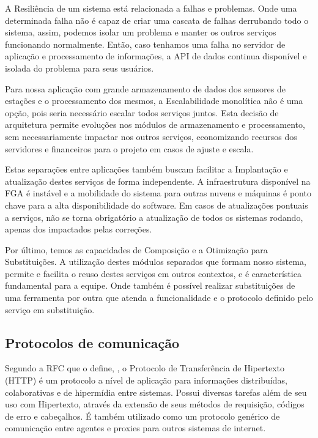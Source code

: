     A Resiliência de um sistema está relacionada a falhas e problemas. Onde uma determinada falha não é capaz de criar uma cascata de falhas derrubando todo o sistema, assim, podemos isolar um problema e manter os outros serviços funcionando normalmente. Então, caso tenhamos uma falha no servidor de aplicação e processamento de informações, a API de dados continua disponível e isolada do problema para seus usuários.
    
    Para nossa aplicação com grande armazenamento de dados dos sensores de estações e o processamento dos mesmos, a Escalabilidade monolítica não é uma opção, pois seria necessário escalar todos serviços juntos. Esta decisão de arquitetura permite evoluções nos módulos de armazenamento e processamento, sem necessariamente impactar nos outros serviços, economizando recursos dos servidores e financeiros para o projeto em casos de ajuste e escala.
    
    Estas separações entre aplicações também buscam facilitar a Implantação e atualização destes serviços de forma independente. A infraestrutura disponível na FGA é instável e a mobilidade do sistema para outras nuvens e máquinas é ponto chave para a alta disponibilidade do software. Em casos de atualizações pontuais a serviços, não se torna obrigatório a atualização de todos os sistemas rodando, apenas dos impactados pelas correções.
    
    Por último, temos as capacidades de Composição e a Otimização para Substituições. A utilização destes módulos separados que formam nosso sistema, permite e facilita o reuso destes serviços em outros contextos, e é característica fundamental para a equipe. Onde também é possível realizar substituições de uma ferramenta por outra que atenda a funcionalidade e o protocolo definido pelo serviço em substituição.

    \subsection{Protocolos de comunicação}
    
    Segundo a RFC que o define, \cite{rfc}, o Protocolo de Transferência de Hipertexto (HTTP) é um protocolo a nível de aplicação para informações distribuídas, colaborativas e de hipermídia entre sistemas. Possui diversas tarefas além de seu uso com Hipertexto, através da extensão de seus métodos de requisição, códigos de erro e cabeçalhos. É também utilizado como um protocolo genérico de comunicação entre agentes e proxies para outros sistemas de internet. 

